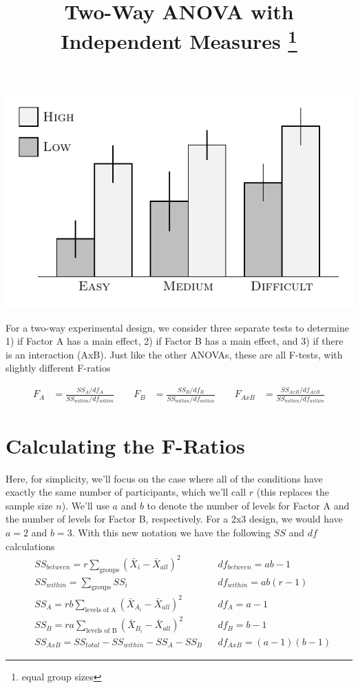 \documentclass{tufte-handout}
\title{Two-Way ANOVA with Independent Measures \thanks{equal group sizes}}
\date{} %
\begin{document}
\maketitle%



\begin{marginfigure}[190pt]
  \includegraphics[width=\linewidth]{anova_data_two-way}%
  \label{fig:fullfig}%
\end{marginfigure}

For a two-way experimental design, we consider three separate tests to determine 1) if Factor A has a main effect, 2) if Factor B has a main effect, and 3) if there is an interaction (AxB). Just like the other ANOVAs, these are all F-tests, with slightly different F-ratios

\begin{align*}
F_A&=\frac{SS_A/df_A}{SS_{within}/df_{within}} \qquad
F_B&=\frac{SS_B/df_B}{SS_{within}/df_{within}} \qquad
F_{AxB} &= \frac{SS_{AxB}/df_{AxB}}{SS_{within}/df_{within}}
\end{align*}

\section{Calculating the F-Ratios}
Here, for simplicity, we'll focus on the case where all of the conditions have exactly the same number of participants, which we'll call $r$  (this replaces the sample size $n$). We'll use $a$  and $b$ to denote the number of levels for Factor A and the number of levels for Factor B, respectively. For a 2x3 design, we would have  $a=2$ and $b=3$. With this new notation we have the following $SS$ and $df$ calculations
\begin{align*}
&SS_{between} = r \sum_{\text{groups}} \left( \bar{X}_i - \bar{X}_{all} \right)^2 & &df_{between} = ab-1\\
&SS_{within} = \sum_{\text{groups}} SS_i & &df_{within} = ab(r-1)\\
&SS_A = rb\sum_{\text{levels of A}} \left( \bar{X}_{A_i} - \bar{X}_{all} \right)^2 & &df_A = a-1\\
&SS_B = ra\sum_{\text{levels of B}} \left( \bar{X}_{B_i} - \bar{X}_{all} \right)^2 & &df_B = b-1\\
&SS_{AxB}=SS_{total}-SS_{within}-SS_A-SS_B & &df_{AxB} = (a-1)(b-1)
\end{align*}
\end{document}
